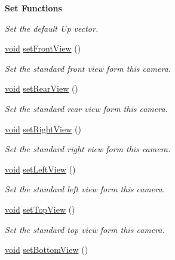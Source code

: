 \begin{Indent}{\bf Set Functions}
\begin{DoxyCompactItemize}
\begin{DoxyCompactList}\small\item\em Set the default Up vector. \end{DoxyCompactList}\item 
\hyperlink{group___u_a_v_objects_plugin_ga444cf2ff3f0ecbe028adce838d373f5c}{void} \hyperlink{class_g_l_c___camera_a8af278479f6aba3e9f93cbc98e91b9bb}{set\-Front\-View} ()
\begin{DoxyCompactList}\small\item\em Set the standard front view form this camera. \end{DoxyCompactList}\item 
\hyperlink{group___u_a_v_objects_plugin_ga444cf2ff3f0ecbe028adce838d373f5c}{void} \hyperlink{class_g_l_c___camera_a858e489b2260f05092a436bfecc98ee4}{set\-Rear\-View} ()
\begin{DoxyCompactList}\small\item\em Set the standard rear view form this camera. \end{DoxyCompactList}\item 
\hyperlink{group___u_a_v_objects_plugin_ga444cf2ff3f0ecbe028adce838d373f5c}{void} \hyperlink{class_g_l_c___camera_a7d5fb7bdbb744822843d37e16d39460d}{set\-Right\-View} ()
\begin{DoxyCompactList}\small\item\em Set the standard right view form this camera. \end{DoxyCompactList}\item 
\hyperlink{group___u_a_v_objects_plugin_ga444cf2ff3f0ecbe028adce838d373f5c}{void} \hyperlink{class_g_l_c___camera_a3c4a23ac7defce1b5902797dbd4a9408}{set\-Left\-View} ()
\begin{DoxyCompactList}\small\item\em Set the standard left view form this camera. \end{DoxyCompactList}\item 
\hyperlink{group___u_a_v_objects_plugin_ga444cf2ff3f0ecbe028adce838d373f5c}{void} \hyperlink{class_g_l_c___camera_a4e60e55cb3720381d4e2f66befe49b3c}{set\-Top\-View} ()
\begin{DoxyCompactList}\small\item\em Set the standard top view form this camera. \end{DoxyCompactList}\item 
\hyperlink{group___u_a_v_objects_plugin_ga444cf2ff3f0ecbe028adce838d373f5c}{void} \hyperlink{class_g_l_c___camera_ada9c9d157ffbcda0175f4be319821119}{set\-Bottom\-View} ()

\end{DoxyCompactItemize}
\end{Indent}
